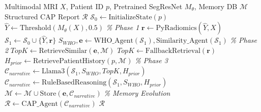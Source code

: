 \begin{algorithm}[t]
\caption{Agentic Execution Pipeline with Fallback Routing}
\label{alg:execution}
\begin{algorithmic}[1]
\REQUIRE Multimodal MRI $X$, Patient ID $p$, Pretrained SegResNet $M_\theta$, Memory DB $\mathcal{M}$
\ENSURE Structured CAP Report $\mathcal{R}$
\STATE $\mathcal{S}_0 \leftarrow \text{InitializeState}(p)$
\STATE $\hat{Y} \leftarrow \text{Threshold}(M_\theta(X), 0.5)$ \hfill \textit{\% Phase 1}
\STATE $\mathbf{r} \leftarrow \text{PyRadiomics}(\hat{Y}, X)$
\STATE $\mathcal{S}_1 \leftarrow \mathcal{S}_0 \cup \{\hat{Y}, \mathbf{r}\}$
\STATE $S_{WHO}, \mathbf{e} \leftarrow \text{WHO\_Agent}(\mathcal{S}_1), \text{Similarity\_Agent}(\mathcal{S}_1)$ \hfill \textit{\% Phase 2}
    \STATE $TopK \leftarrow \text{RetrieveSimilar}(\mathbf{e}, \mathcal{M})$
\ELSE
    \STATE $TopK \leftarrow \text{FallbackRetrieval}(\mathbf{r})$
\ENDIF
\STATE $H_{prior} \leftarrow \text{RetrievePatientHistory}(p, \mathcal{M})$ \hfill \textit{\% Phase 3}
    \STATE $\mathcal{C}_{narrative} \leftarrow \text{Llama3}(\mathcal{S}_1, S_{WHO}, TopK, H_{prior})$
\ELSE
    \STATE $\mathcal{C}_{narrative} \leftarrow \text{RuleBasedReasoning}(\mathcal{S}_1, S_{WHO}, H_{prior})$
\ENDIF
\STATE $\mathcal{M} \leftarrow \mathcal{M} \cup \text{Store}(\mathbf{e}, \mathcal{C}_{narrative})$ \hfill \textit{\% Memory Evolution}
\STATE $\mathcal{R} \leftarrow \text{CAP\_Agent}(\mathcal{C}_{narrative})$
\RETURN $\mathcal{R}$
\end{algorithmic}
\end{algorithm}
